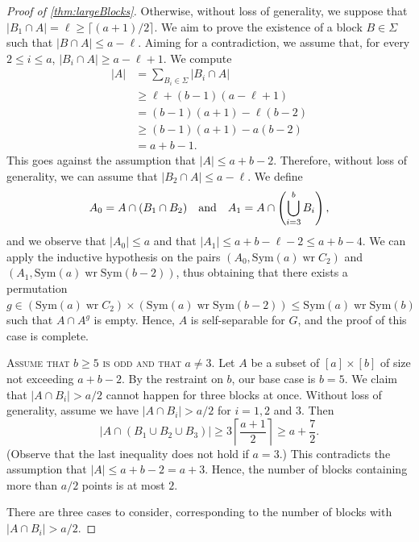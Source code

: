 \documentclass[a4paper]{amsart}
\newcommand{\Sym}{\mathrm{Sym}}
\renewcommand{\wr}{\mathop{\mathrm{wr}}}
\theoremstyle{definition}
\begin{document}
\begin{proof}[Proof of \cref{thm:largeBlocks}]
    Otherwise, without loss of generality, we suppose that $|B_1 \cap A| = \ell \ge \lceil (a+1) /2 \rceil$. We aim to prove the existence of a block $B \in \Sigma$ such that $|B \cap A| \leq a - \ell$. Aiming for a contradiction, we assume that, for every $2\leq i \leq a$, $|B_i \cap A| \ge a - \ell +1$. We compute 
    \begin{align*}
        |A| &= \sum_{B_i \in \Sigma}|B_i \cap A| 
        \\&\geq \ell + (b-1)( a -\ell + 1)
        \\&= (b-1)(a+1) - \ell(b-2)
        \\&\geq (b-1)(a+1) - a(b-2)
        \\&= a + b - 1 .
    \end{align*}
    This goes against the assumption that $|A| \le a + b - 2$. Therefore, without loss of generality, we can assume that $ |B_2 \cap A| \leq a - \ell$. We define
    \[ A_0 = A \cap (B_1 \cap B_2) \quad \hbox{and} \quad A_1 = A \cap \left( \bigcup_{i=3}^b B_i \right) ,\]
    and we observe that $|A_0| \le a $ and that $|A_1| \le a + b - \ell - 2 \le a +b - 4$. We can apply the inductive hypothesis on the pairs $(A_0, \Sym(a) \wr C_2)$ and $(A_1, \Sym(a) \wr \Sym(b-2))$, thus obtaining that there exists a permutation $g \in (\Sym(a) \wr C_2) \times (\Sym(a) \wr \Sym(b-2)) \le \Sym(a) \wr \Sym(b)$ such that $A \cap A^g$ is empty. Hence, $A$ is self-separable for $G$, and the proof of this case is complete.

    \smallskip
    \noindent \textsc{Assume that $b \ge 5$ is odd and that $a\neq 3$.} Let $A$ be a subset of $[a]\times[b]$ of size not exceeding $a+b-2$. By the restraint on $b$, our base case is $b=5$. We claim that $|A \cap B_i| > a/2$ cannot happen for three blocks at once. Without loss of generality, assume we have $|A \cap B_i| > a/2$ for $i=1,2$ and $3.$ Then
    \[ |A \cap (B_1\cup B_2\cup B_3)| \ge 3 \left\lceil \frac{a+1}{2} \right\rceil \geq  a + \frac{7}{2}.\]
    (Observe that the last inequality does not hold if $a=3$.) This contradicts the assumption that $|A| \le a + b - 2 = a + 3$. Hence, the number of blocks containing more than $a/2$ points is at most $2$. 
    
   There are three cases to consider, corresponding to the number of blocks with $|A \cap B_i| > a/2$. 
   

\end{proof}
\end{document}
